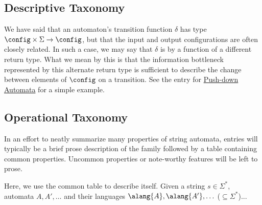 \subsection{Descriptive Taxonomy}

We have said that an automaton's transition function $\delta$ has type
$\config \times \Sigma \to \config$, but that the input and output
configurations are often closely related.  In such a case, we may say that
$\delta$ is  by a function of a different return
type.  What we mean by this is that the information bottleneck represented
by this alternate return type is sufficient to describe the change between
elements of $\config$ on a transition.  See the entry for
\hyperref[sec:zoo-str/pda]{Push-down Automata} for a simple example.

\subsection{Operational Taxonomy}

In an effort to neatly summarize many properties of string automata, entries
will typically be a brief prose description of the family followed by a
table containing common properties.  Uncommon properties or note-worthy
features will be left to prose.

Here, we use the common table to describe itself.  Given a string $s \in
\Sigma^*$, automata $A, A', \ldots$ and their languages $\alang{A},
\alang{A'}, \ldots$ ($\subseteq \Sigma^*$)...

